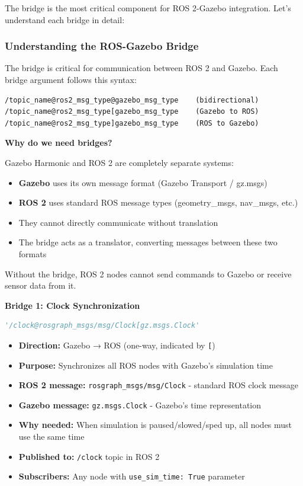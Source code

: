 The bridge is the most critical component for ROS 2-Gazebo integration. Let's understand each bridge in detail:

\subsubsection{Understanding the ROS-Gazebo Bridge}

The bridge is critical for communication between ROS 2 and Gazebo. Each bridge argument follows this syntax:

\begin{verbatim}
/topic_name@ros2_msg_type@gazebo_msg_type    (bidirectional)
/topic_name@ros2_msg_type[gazebo_msg_type    (Gazebo to ROS)
/topic_name@ros2_msg_type]gazebo_msg_type    (ROS to Gazebo)
\end{verbatim}

\textbf{Why do we need bridges?}

Gazebo Harmonic and ROS 2 are completely separate systems:
\begin{itemize}
	\item \textbf{Gazebo} uses its own message format (Gazebo Transport / gz.msgs)
	\item \textbf{ROS 2} uses standard ROS message types (geometry\_msgs, nav\_msgs, etc.)
	\item They cannot directly communicate without translation
	\item The bridge acts as a translator, converting messages between these two formats
\end{itemize}

Without the bridge, ROS 2 nodes cannot send commands to Gazebo or receive sensor data from it.

\textbf{Bridge 1: Clock Synchronization}
\begin{lstlisting}[language=Python]
'/clock@rosgraph_msgs/msg/Clock[gz.msgs.Clock'
\end{lstlisting}

\begin{itemize}
	\item \textbf{Direction:} Gazebo → ROS (one-way, indicated by \texttt{[})
	\item \textbf{Purpose:} Synchronizes all ROS nodes with Gazebo's simulation time
	\item \textbf{ROS 2 message:} \texttt{rosgraph\_msgs/msg/Clock} - standard ROS clock message
	\item \textbf{Gazebo message:} \texttt{gz.msgs.Clock} - Gazebo's time representation
	\item \textbf{Why needed:} When simulation is paused/slowed/sped up, all nodes must use the same time
	\item \textbf{Published to:} \texttt{/clock} topic in ROS 2
	\item \textbf{Subscribers:} Any node with \texttt{use\_sim\_time: True} parameter
\end{itemize}

